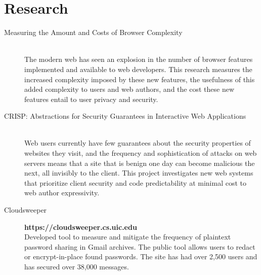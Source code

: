 \documentclass{vitae}
\begin{document}
  \section{Research}
  \begin{description}

    \item[Measuring the Amount and Costs of Browser Complexity] ~\\
    The modern web has seen an explosion in the number of browser features implemented and available to web developers.  This research measures the increased complexity imposed by these new features, the usefulness of this added complexity to users and web authors, and the cost these new features entail to user privacy and security.

    \item[CRISP: Abstractions for Security Guarantees in Interactive Web Applications] ~\\
    Web users currently have few guarantees about the security properties of websites they visit, and the frequency and sophistication of attacks on web servers means that a site that is benign one day can become malicious the next, all invisibly to the client.  This project investigates new web systems that prioritize client security and code predictability at minimal cost to web author expressivity.

    \item[Cloudsweeper] \hfill \textbf{https://cloudsweeper.cs.uic.edu}\\
    Developed tool to measure and mitigate the frequency of plaintext password sharing in Gmail archives. The public tool allows users to redact or encrypt-in-place found passwords. The site has had over 2,500 users and has secured over 38,000 messages.
  \end{description}
\end{document}

